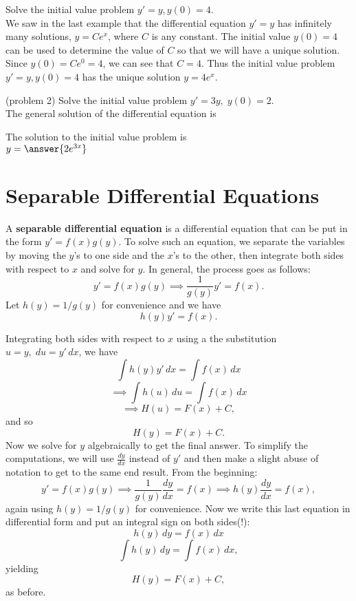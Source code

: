 \documentclass{ximera}
\begin{document}
\begin{example}[example 2]
Solve the initial value problem $y' = y, y(0) = 4$.\\
We saw in the last example that the differential equation $y' = y$ has infinitely many solutions, $y = Ce^x$, where $C$ is any constant.
The initial value $y(0) = 4$ can be used to determine the value of $C$ so that we will have a unique solution. Since $y(0) = Ce^0 = 4$, we can see that $C = 4$.
Thus the initial value problem $y' = y, y(0) = 4$ has the unique solution $y = 4e^x$.
\end{example}



\begin{problem}(problem 2)
Solve the initial value problem $y' = 3y, \; y(0) = 2$.\\

The general solution of the differential equation is

\begin{multipleChoice}
\end{multipleChoice}

The solution to the initial value problem is\\
$y = \answer{2e^{3x}}$
\end{problem}




\section{Separable Differential Equations}

A \textbf{separable differential equation} is a differential equation that can be put in the form
$y' = f(x)g(y)$. To solve such an equation, we separate the variables by moving the $y$'s to one side and the $x$'s to the other, then integrate both sides with respect to $x$
and solve for $y$. In general, the process goes as follows:
\[
y' = f(x)g(y) \implies \frac{1}{g(y)} y'= f(x) .
\]
Let $h(y) = 1/g(y)$ for convenience and we have
\[
h(y) y'= f(x).
\]

Integrating both sides with respect to $x$ using a the substitution $u = y, \; du = y' \, dx$, we have
\[
\int h(y) y' \, dx = \int f(x) \, dx
\]
\[
\implies \int h(u) \, du = \int f(x) \, dx
\]
\[
\implies H(u) = F(x) + C,
\]
and so
\[
H(y) = F(x) + C.
\]
Now we solve for $y$ algebraically to get the final answer.  To simplify the computations, we will use $\frac{dy}{dx}$ instead of $y'$ and then 
make a slight abuse of notation to get to the same end result. From the beginning:
\[
y' = f(x) g(y) \implies \frac{1}{g(y)} \frac{dy}{dx} = f(x) \implies h(y) \frac{dy}{dx} = f(x),
\]
again using $h(y) = 1/g(y)$ for convenience. Now we write this last equation in differential form and put an integral sign on both sides(!):
\[
h(y)\, dy = f(x) \, dx
\]
\[
\int h(y) \, dy = \int f(x) \, dx,
\]
yielding
\[
H(y) = F(x) + C,
\]
as before.
\end{document}
